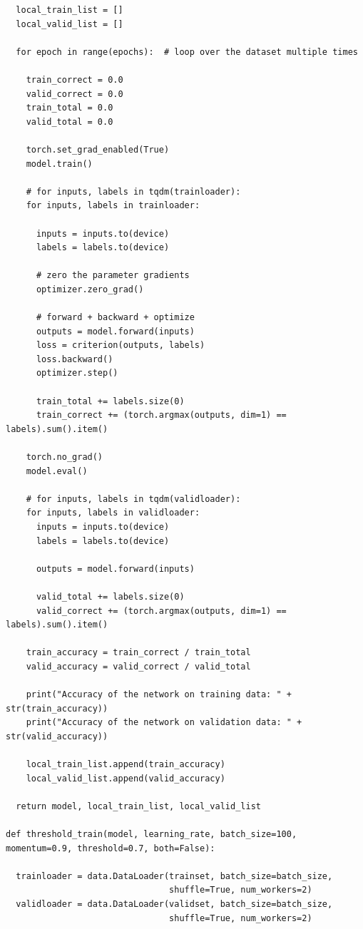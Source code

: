 \documentclass{article}
\newcommand{\1}{\mathbf{1}}
\begin{document}
{\begin{verbatim}
  local_train_list = []
  local_valid_list = []

  for epoch in range(epochs):  # loop over the dataset multiple times

    train_correct = 0.0
    valid_correct = 0.0
    train_total = 0.0
    valid_total = 0.0

    torch.set_grad_enabled(True)
    model.train()

    # for inputs, labels in tqdm(trainloader):
    for inputs, labels in trainloader:

      inputs = inputs.to(device)
      labels = labels.to(device)

      # zero the parameter gradients
      optimizer.zero_grad()

      # forward + backward + optimize
      outputs = model.forward(inputs)
      loss = criterion(outputs, labels)
      loss.backward()
      optimizer.step()
        
      train_total += labels.size(0)
      train_correct += (torch.argmax(outputs, dim=1) == labels).sum().item()
    
    torch.no_grad()
    model.eval()

    # for inputs, labels in tqdm(validloader):
    for inputs, labels in validloader:
      inputs = inputs.to(device)
      labels = labels.to(device)

      outputs = model.forward(inputs)
        
      valid_total += labels.size(0)
      valid_correct += (torch.argmax(outputs, dim=1) == labels).sum().item()

    train_accuracy = train_correct / train_total
    valid_accuracy = valid_correct / valid_total

    print("Accuracy of the network on training data: " + str(train_accuracy))
    print("Accuracy of the network on validation data: " + str(valid_accuracy))

    local_train_list.append(train_accuracy)
    local_valid_list.append(valid_accuracy)

  return model, local_train_list, local_valid_list

def threshold_train(model, learning_rate, batch_size=100, momentum=0.9, threshold=0.7, both=False):
  
  trainloader = data.DataLoader(trainset, batch_size=batch_size,
                                shuffle=True, num_workers=2)
  validloader = data.DataLoader(validset, batch_size=batch_size,
                                shuffle=True, num_workers=2)


\end{verbatim}}
\end{document}
